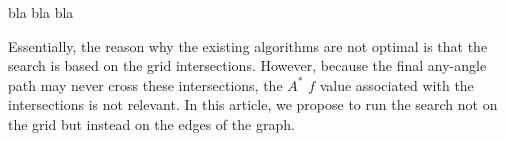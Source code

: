 bla bla bla

Essentially, the reason why the existing algorithms are not optimal
is that the search is based on the grid intersections.  
However, because the final any-angle path 
may never cross these intersections, 
the $A^*$ $f$ value associated with the intersections
is not relevant.  
In this article, we propose to run the search not on the grid 
but instead on the edges of the graph.  

